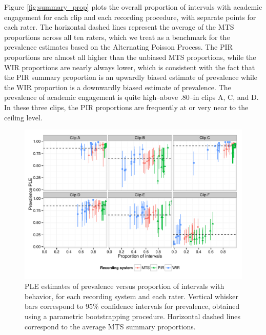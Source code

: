 \documentclass[man, noextraspace, floatsintext]{apa6}\usepackage[]{graphicx}\usepackage[]{color}
\makeatletter
\def\maxwidth{ %
  \ifdim\Gin@nat@width>\linewidth
    \linewidth
  \else
    \Gin@nat@width
  \fi
}
\newenvironment{knitrout}{}{} %
\makeatother
\begin{document}
Figure \ref{fig:summary_prop} plots the overall proportion of intervals with academic engagement for each clip and each recording procedure, with separate points for each rater. The horizontal dashed lines represent the average of the MTS proportions across all ten raters, which we treat as a benchmark for the prevalence estimates based on the Alternating Poisson Process. The PIR proportions are almost all higher than the unbiased MTS proportions, while the WIR proportions are nearly always lower, which is consistent with the fact that the PIR summary proportion is an upwardly biased estimate of prevalence while the WIR proportion is a downwardly biased estimate of prevalence. The prevalence of academic engagement is quite high--above .80--in clips A, C, and D. In these three clips, the PIR proportions are frequently at or very near to the ceiling level. 



\begin{knitrout}
\color{fgcolor}\begin{figure}[tb]


{\centering \includegraphics[width=\maxwidth]{fig/johnson_phi_est} 

}

\caption[PLE estimates of prevalence versus proportion of intervals with behavior, for each recording system and each rater]{PLE estimates of prevalence versus proportion of intervals with behavior, for each recording system and each rater. Vertical whisker bars correspond to 95\% confidence intervals for prevalence, obtained using a parametric bootstrapping procedure. Horizontal dashed lines correspond to the average MTS summary proportions.\label{fig:johnson_phi_est}}
\end{figure}


\end{knitrout}
\end{document}
